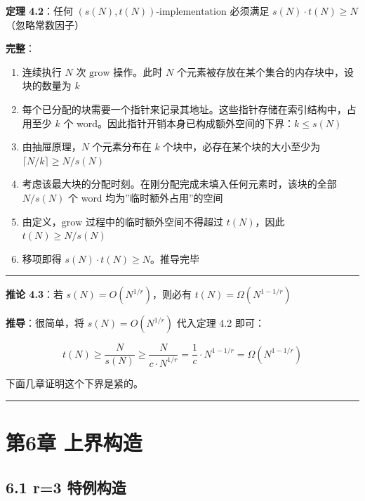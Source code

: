 \documentclass[
  UTF8,
  a4paper,
  12pt]{ctexart}
\providecommand{\tightlist}{%
  \setlength{\itemsep}{0pt}\setlength{\parskip}{0pt}}
\begin{document}
\textbf{定理 4.2}：任何 \((s(N), t(N))\)-\(\text{implementation}\)
必须满足 \(s(N) \cdot t(N) \ge N\)（忽略常数因子）

\textbf{完整}：

\begin{enumerate}
\def\labelenumi{\arabic{enumi}.}
\tightlist
\item
  连续执行 \(N\) 次 \(\text{grow}\) 操作。此时 \(N\)
  个元素被存放在某个集合的内存块中，设块的数量为 \(k\)
\item
  每个已分配的块需要一个指针来记录其地址。这些指针存储在索引结构中，占用至少
  \(k\) 个 word。因此指针开销本身已构成额外空间的下界：\(k \le s(N)\)
\item
  由抽屉原理，\(N\) 个元素分布在 \(k\) 个块中，必存在某个块的大小至少为
  \(\lceil N/k \rceil \ge N/s(N)\)
\item
  考虑该最大块的分配时刻。在刚分配完成未填入任何元素时，该块的全部
  \(N/s(N)\) 个 word 均为''临时额外占用''的空间
\item
  由定义，\(\text{grow}\) 过程中的临时额外空间不得超过 \(t(N)\)，因此
  \(t(N) \ge N/s(N)\)
\item
  移项即得 \(s(N) \cdot t(N) \ge N\)。推导完毕
\end{enumerate}

\begin{center}\rule{0.5\linewidth}{0.5pt}\end{center}

\textbf{推论 4.3}：若 \(s(N) = O(N^{1/r})\)，则必有
\(t(N) = \Omega(N^{1-1/r})\)

\textbf{推导}：很简单，将 \(s(N) = O(N^{1/r})\) 代入定理 4.2 即可：

\[t(N) \ge \frac{N}{s(N)} \ge \frac{N}{c \cdot N^{1/r}} = \frac{1}{c} \cdot N^{1-1/r} = \Omega(N^{1-1/r})\]

下面几章证明这个下界是紧的。

\begin{center}\rule{0.5\linewidth}{0.5pt}\end{center}

\section{第6章 上界构造}\label{ux7b2c6ux7ae0-ux4e0aux754cux6784ux9020}

\subsection{6.1 r=3 特例构造}\label{r3-ux7279ux4f8bux6784ux9020}
\end{document}
